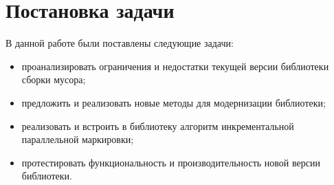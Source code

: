 \section{Постановка задачи}

В данной работе были поставлены следующие задачи:

\begin{itemize}
\item проанализировать ограничения и недостатки текущей версии библиотеки сборки мусора;
\item предложить и реализовать новые методы для модернизации библиотеки;
\item реализовать и встроить в библиотеку алгоритм инкрементальной параллельной маркировки; 
\item протестировать функциональность и производительность новой версии библиотеки.
\end{itemize}
